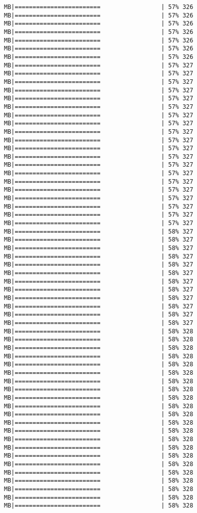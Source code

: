 \documentclass[
]{article}
\begin{document}
\begin{verbatim}
MB|========================                 | 57% 326 MB|========================                 | 57% 326 MB|========================                 | 57% 326 MB|========================                 | 57% 326 MB|========================                 | 57% 326 MB|========================                 | 57% 326 MB|========================                 | 57% 326 MB|========================                 | 57% 327 MB|========================                 | 57% 327 MB|========================                 | 57% 327 MB|========================                 | 57% 327 MB|========================                 | 57% 327 MB|========================                 | 57% 327 MB|========================                 | 57% 327 MB|========================                 | 57% 327 MB|========================                 | 57% 327 MB|========================                 | 57% 327 MB|========================                 | 57% 327 MB|========================                 | 57% 327 MB|========================                 | 57% 327 MB|========================                 | 57% 327 MB|========================                 | 57% 327 MB|========================                 | 57% 327 MB|========================                 | 57% 327 MB|========================                 | 57% 327 MB|========================                 | 57% 327 MB|========================                 | 57% 327 MB|========================                 | 58% 327 MB|========================                 | 58% 327 MB|========================                 | 58% 327 MB|========================                 | 58% 327 MB|========================                 | 58% 327 MB|========================                 | 58% 327 MB|========================                 | 58% 327 MB|========================                 | 58% 327 MB|========================                 | 58% 327 MB|========================                 | 58% 327 MB|========================                 | 58% 327 MB|========================                 | 58% 327 MB|========================                 | 58% 328 MB|========================                 | 58% 328 MB|========================                 | 58% 328 MB|========================                 | 58% 328 MB|========================                 | 58% 328 MB|========================                 | 58% 328 MB|========================                 | 58% 328 MB|========================                 | 58% 328 MB|========================                 | 58% 328 MB|========================                 | 58% 328 MB|========================                 | 58% 328 MB|========================                 | 58% 328 MB|========================                 | 58% 328 MB|========================                 | 58% 328 MB|========================                 | 58% 328 MB|========================                 | 58% 328 MB|========================                 | 58% 328 MB|========================                 | 58% 328 MB|========================                 | 58% 328 MB|========================                 | 58% 328 MB|========================                 | 58% 328 MB|========================                 | 58% 328 
\end{verbatim}
\end{document}
